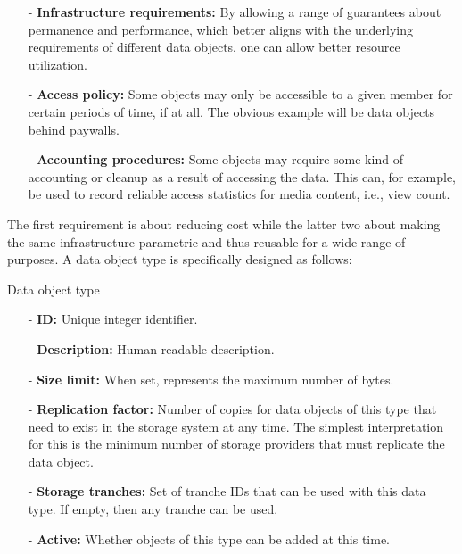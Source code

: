 \documentclass{article}
\newenvironment{concept_box}[1]
    {
    \begin{tcolorbox}
    {\large \textbf{#1} }
    }
    {
    \end{tcolorbox}
    }
\begin{document}
\begin{itemize}
  \item[-] \textbf{Infrastructure requirements:} By allowing a range of guarantees about permanence and performance, which better aligns with the underlying requirements of different data objects, one can allow better resource utilization.

  \item[-] \textbf{Access policy:} Some objects may only be accessible to a given member for certain periods of time, if at all. The obvious example will be data objects behind paywalls.

  \item[-] \textbf{Accounting procedures:} Some objects may require some kind of accounting or cleanup as a result of accessing the data. This can, for example, be used to record reliable access statistics for media content, i.e., view count.

\end{itemize}

The first requirement is about reducing cost while the latter two about making the same infrastructure parametric and thus reusable for a wide range of purposes. A data object type is specifically designed as follows:  \\

\begin{concept_box}{Data object type}

\begin{itemize}
  \item[-] \textbf{ID:} Unique integer identifier.
  \item[-] \textbf{Description:} Human readable description.
  \item[-] \textbf{Size limit:} When set, represents the maximum number of bytes.
  \item[-] \textbf{Replication factor:} Number of copies for data objects of this type that need to exist in the storage system at any time. The simplest interpretation for this is the minimum number of storage providers that must replicate the data object.
  \item[-] \textbf{Storage tranches:} Set of tranche IDs that can be used with this data type. If empty, then any tranche can be used.
  \item[-] \textbf{Active:} Whether objects of this type can be added at this time.
\end{itemize}
\end{concept_box}
\end{document}
